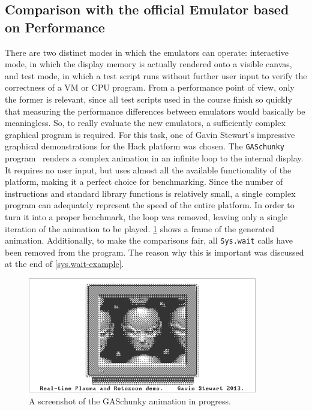 
\subsection{Comparison with the official Emulator based on Performance} \label{sec:benchmarks}
There are two distinct modes in which the emulators can operate: interactive mode, in which the display memory is actually rendered onto a visible canvas, and test mode, in which a test script runs without further user input to verify the correctness of a VM or CPU program.
From a performance point of view, only the former is relevant, since all test scripts used in the course finish so quickly that measuring the performance differences between emulators would basically be meaningless.
So, to really evaluate the new emulators, a sufficiently complex graphical program is required.
For this task, one of Gavin Stewart's impressive graphical demonstrations for the Hack platform was chosen.
The \verb+GASchunky+ program~\cite{demos} renders a complex animation in an infinite loop to the internal display.
It requires no user input, but uses almost all the available functionality of the platform, making it a perfect choice for benchmarking.
Since the number of instructions and standard library functions is relatively small, a single complex program can adequately represent the speed of the entire platform.
In order to turn it into a proper benchmark, the loop was removed, leaving only a single iteration of the animation to be played.
\cref{fig:gaschunky-screenshot} shows a frame of the generated animation.
Additionally, to make the comparisons fair, all \verb+Sys.wait+ calls have been removed from the program.
The reason why this is important was discussed at the end of \cref{sys.wait-example}.
\begin{center}
  \begin{figure}[ht]
    \centering
    \includegraphics[width=10cm]{fig/gaschunky.png}
    \caption{A screenshot of the GASchunky animation in progress.}%
    \label{fig:gaschunky-screenshot}
  \end{figure}
\end{center}
